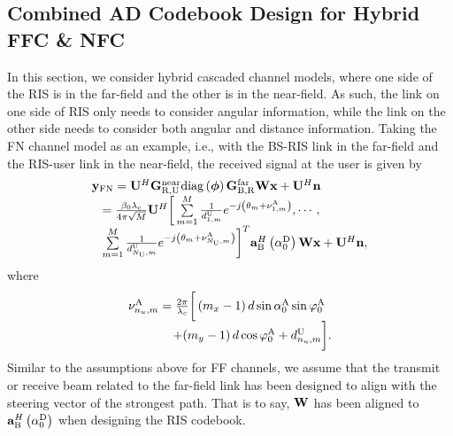 \documentclass[lettersize, journal]{IEEEtran}
\begin{document}
\subsection{ Combined AD Codebook Design for Hybrid FFC \& NFC }

In this section, we consider hybrid cascaded channel models, where one side of the RIS is in the far-field and the other is in the near-field.
As such, the link on one side of RIS only needs to consider angular information, while the link on the other side needs to consider both angular and distance information.
Taking the FN channel model as an example, i.e., with the BS-RIS link in the far-field and the RIS-user link in the near-field, the received signal at the user is given by
\begin{equation}\label{received_FN}
\begin{array}{l}
{\bf{y}}_{{\rm{FN}}} = {\bf{U}}^H {{\bf{G}}_{{\rm{R}}, {\rm{U}}}^{\rm{near}}} {\rm diag} \left({\bm{\phi }}\right) {{\bf{G}}_{{\rm{B}}, {\rm{R}}}^{\rm{far}}} {\bf{W}} {\bf{x}} + {\bf{U}}^H {\bf{n}}\\
\;\;\; = \frac{{\beta _0} \lambda_c}{4\pi{\sqrt {M} }} {\bf{U}}^H
\bigg[ \sum\limits_{m = 1}^{M} \frac{1}{ d_{1, m}^{\rm{U}}} e^{ -j\left(\theta_m + \nu_{1, m}^{{\rm{A}}} \right) } 
 , \cdots,   \\
\;\;\;  \sum\limits_{m = 1}^{M} \frac{1}{ d_{N_{\rm{U}}, m}^{\rm{U}}} e^{-j\left(\theta_m + \nu_{N_{\rm{U}}, m}^{{\rm{A}}} \right)} \bigg]^T
{{\bf{a}}_{\rm{B}}^H}\left( {\alpha _0^{\rm{D}}} \right)  {\bf{W}} {\bf{x}}  + {\bf{U}}^H {\bf{n}}, 
\end{array}
\end{equation}
where
\begin{equation}
\begin{array}{l}
\nu_{n_u, m}^{\rm{A}} = \frac{{2\pi }}{\lambda_c } \bigg[ \left( {{m_x} - 1} \right)d\sin \alpha_0^{\rm{A}} \sin \varphi_0^{\rm{A}} \\
\;\;\;\;\;\;\;\;\;\;\;\;\; + { \left( {{m_y} - 1} \right)d\cos \varphi_0^{\rm{A}} }  + d_{n_u, m}^{\rm{U}} \bigg].
\end{array}
\end{equation}
Similar to the assumptions above for FF channels, 
we assume that the transmit or receive beam related to the far-field link has been designed to align with the steering vector of the strongest path.
That is to say, $ {\bf{W}} $ has been aligned to ${{\bf{a}}_{\rm{B}}^H}\left( {\alpha _0^{\rm{D}}} \right) $ when designing the RIS codebook.
\end{document}

